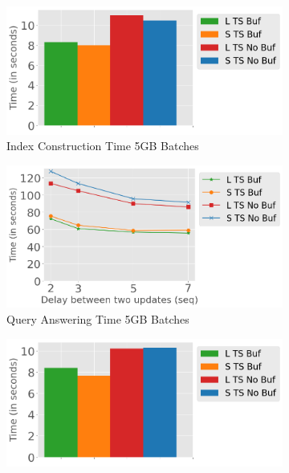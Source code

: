 \begin{figure}
	\centering
	\begin{subfigure}[c]{0.48\textwidth}
		\includegraphics[width=1\textwidth]   {figures/Experiments/Dynamic/5GB/7/indexConstruction_7_5GB.png}
		\caption{Index Construction Time 5GB Batches}
		\label{fig:actual-index-Construction-time-5GB}
	\end{subfigure}
	\begin{subfigure}[c]{0.48\textwidth}
		\includegraphics[width=1\textwidth]	 {figures/Experiments/Dynamic/5GB/delays_xaxis_5GB.png}
		\caption{Query Answering Time 5GB Batches}
		\label{fig:actual-query-answering-time-5GB}
	\end{subfigure}
	\begin{subfigure}[c]{0.48\textwidth}
		\includegraphics[width=1\textwidth]   {figures/Experiments/Dynamic/20GB/7/dataset_115343360_lockfree_Messi_ResultsindexConstruction_7_20GB.png}

\end{subfigure}
\end{figure}
